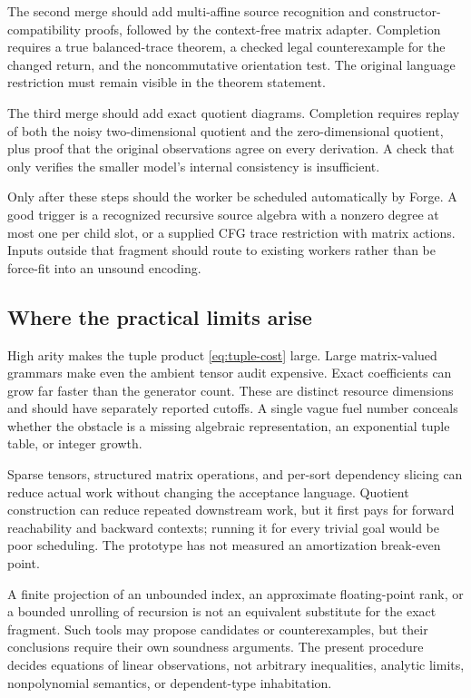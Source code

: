\documentclass[11pt,letterpaper]{article}
\theoremstyle{definition}\newtheorem{definition}[theorem]{Definition}
\theoremstyle{remark}\newtheorem{remark}[theorem]{Remark}
\begin{document}
The second merge should add multi-affine source recognition and constructor-compatibility proofs, followed by the context-free matrix adapter. Completion requires a true balanced-trace theorem, a checked legal counterexample for the changed return, and the noncommutative orientation test. The original language restriction must remain visible in the theorem statement.

The third merge should add exact quotient diagrams. Completion requires replay of both the noisy two-dimensional quotient and the zero-dimensional quotient, plus proof that the original observations agree on every derivation. A check that only verifies the smaller model's internal consistency is insufficient.

Only after these steps should the worker be scheduled automatically by Forge. A good trigger is a recognized recursive source algebra with a nonzero degree at most one per child slot, or a supplied CFG trace restriction with matrix actions. Inputs outside that fragment should route to existing workers rather than be force-fit into an unsound encoding.

\subsection{Where the practical limits arise}
High arity makes the tuple product \eqref{eq:tuple-cost} large. Large matrix-valued grammars make even the ambient tensor audit expensive. Exact coefficients can grow far faster than the generator count. These are distinct resource dimensions and should have separately reported cutoffs. A single vague fuel number conceals whether the obstacle is a missing algebraic representation, an exponential tuple table, or integer growth.

Sparse tensors, structured matrix operations, and per-sort dependency slicing can reduce actual work without changing the acceptance language. Quotient construction can reduce repeated downstream work, but it first pays for forward reachability and backward contexts; running it for every trivial goal would be poor scheduling. The prototype has not measured an amortization break-even point.

A finite projection of an unbounded index, an approximate floating-point rank, or a bounded unrolling of recursion is not an equivalent substitute for the exact fragment. Such tools may propose candidates or counterexamples, but their conclusions require their own soundness arguments. The present procedure decides equations of linear observations, not arbitrary inequalities, analytic limits, nonpolynomial semantics, or dependent-type inhabitation.
\end{document}
